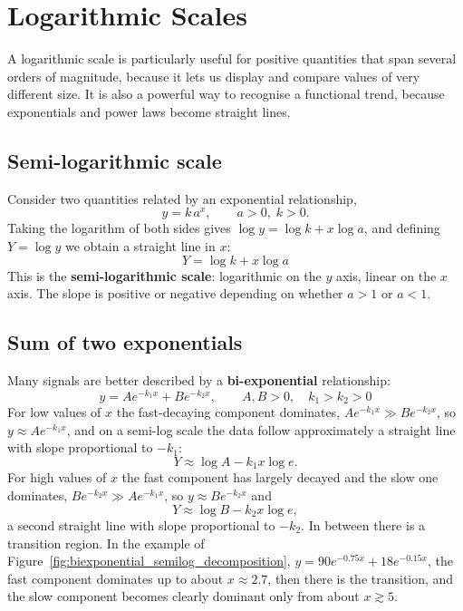 \documentclass[letterpaper,11pt,leqno]{book}
\begin{document}
\section{Logarithmic Scales}
\label{sec:log_scales}

A logarithmic scale is particularly useful for positive quantities that span several orders of magnitude, because it lets us display and compare values of very different size. It is also a powerful way to recognise a functional trend, because exponentials and power laws become straight lines.

\subsection{Semi-logarithmic scale}

Consider two quantities related by an exponential relationship,
\begin{equation}
y = k\,a^x, \qquad a > 0, \; k > 0.
\label{eq:exponential_scaling_general}
\end{equation}
Taking the logarithm of both sides gives $\log y = \log k + x\log a$, and defining $Y = \log y$ we obtain a straight line in $x$:
\begin{equation}
\boxed{Y = \log k + x\log a}
\label{eq:semi_log_linear_form}
\end{equation}
This is the \textbf{semi-logarithmic scale}: logarithmic on the $y$ axis, linear on the $x$ axis. The slope is positive or negative depending on whether $a > 1$ or $a < 1$.

\subsection{Sum of two exponentials}

Many signals are better described by a \textbf{bi-exponential} relationship:
\begin{equation}
\boxed{y = Ae^{-k_1x} + Be^{-k_2x}, \qquad A, B > 0, \quad k_1 > k_2 > 0}
\label{eq:biexponential_decay_model}
\end{equation}
For low values of $x$ the fast-decaying component dominates, $Ae^{-k_1x} \gg Be^{-k_2x}$, so $y \approx Ae^{-k_1x}$, and on a semi-log scale the data follow approximately a straight line with slope proportional to $-k_1$:
\begin{equation}
Y \approx \log A - k_1 x\log e.
\label{eq:fast_component_asymptote}
\end{equation}
For high values of $x$ the fast component has largely decayed and the slow one dominates, $Be^{-k_2x} \gg Ae^{-k_1x}$, so $y \approx Be^{-k_2x}$ and
\begin{equation}
Y \approx \log B - k_2 x\log e,
\label{eq:slow_component_asymptote}
\end{equation}
a second straight line with slope proportional to $-k_2$. In between there is a transition region. In the example of Figure~\ref{fig:biexponential_semilog_decomposition}, $y = 90e^{-0.75x} + 18e^{-0.15x}$, the fast component dominates up to about $x \approx 2.7$, then there is the transition, and the slow component becomes clearly dominant only from about $x \gtrsim 5$.
\end{document}
